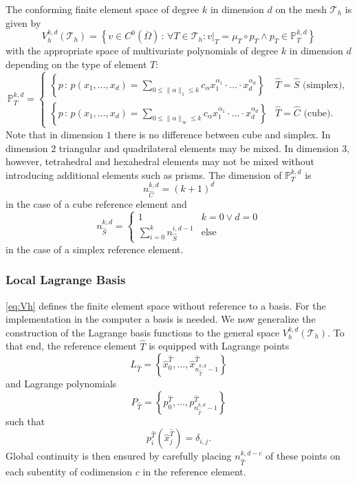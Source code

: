 \documentclass[a4paper,12pt]{article}
\begin{document}
The conforming finite element space of degree $k$ in dimension $d$ on the mesh
$\mathcal{T}_h$ is given by
\begin{equation}
V_h^{k,d}(\mathcal{T}_h) = \left\{ v\in C^0(\overline{\Omega}) \,:\,
\forall T\in\mathcal{T}_h : v|_T = \mu_T \circ p_T \wedge p_T\in\mathbb{P}_T^{k,d}\right\}
\label{eq:Vh}
\end{equation}
with the appropriate space of multivariate polynomials of degree $k$ in dimension $d$
depending on the type of element $T$:
\begin{equation}
\mathbb{P}_T^{k,d} = \left\{\begin{array}{ll}
\left\{ p\,:\, p(x_1,\ldots,x_d) = \sum\limits_{0\leq\|\alpha\|_1\leq k} c_\alpha
x_1^{\alpha_1}\cdot\ldots\cdot x_d^{\alpha_d}\right\} & \text{$\hat T = \hat S$ (simplex)}, \\
\left\{ p\,:\, p(x_1,\ldots,x_d) = \sum\limits_{0\leq\|\alpha\|_\infty\leq k} c_\alpha
x_1^{\alpha_1}\cdot\ldots\cdot x_d^{\alpha_d}\right\} & \text{$\hat T = \hat C$ (cube)} .
\end{array}\right .
\end{equation}
Note that in dimension $1$ there is no difference between cube and simplex.
In dimension $2$ triangular and quadrilateral elements may be mixed. In
dimension $3$, however, tetrahedral and hexahedral elements may not be mixed
without introducing additional elements such as prisms.
The dimension of  $\mathbb{P}_T^{k,d}$ is
\begin{equation*}
n_{\hat C}^{k,d} = (k+1)^d
\end{equation*}
in the case of a cube reference element and
\begin{equation*}
n_{\hat S}^{k,d} = \left\{ \begin{array}{ll}
1 & k=0 \vee d=0\\
\sum_{i=0}^k n_{\hat S}^{i,d-1} &\text{else}
\end{array}\right .
\end{equation*}
in the case of a simplex reference element.

\subsubsection*{Local Lagrange Basis}

\eqref{eq:Vh} defines the finite element space without reference to a basis.
For the implementation in the computer a basis is needed. We now generalize
the construction of the Lagrange basis functions to the general space $V_h^{k,d}(\mathcal{T}_h)$.
To that end, the reference element $\hat T$ is equipped with Lagrange
points
$$L_{\hat T} = \left\{ \hat x^{\hat T}_0,\ldots,\hat x^{\hat T}_{n_{\hat T}^{k,d}-1} \right\}$$
and Lagrange polynomials
$$P_{\hat T} = \left\{ p^{\hat T}_0,\ldots,p^{\hat T}_{n_{\hat T}^{k,d}-1}\right\}$$
such that $$p^{\hat T}_i(\hat x^{\hat T}_j) = \delta_{i,j}.$$
Global continuity is then ensured by carefully placing $n_{\hat T}^{k,d-c}$ of these
points on each subentity of codimension $c$ in the reference element.
\end{document}
